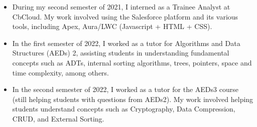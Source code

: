 \documentclass[10pt,a4paper,ragged2e]{altacv}
\begin{document}


\begin{fullwidth}
\makecvheader
\end{fullwidth}


\begin{itemize}
\item During my second semester of 2021, I interned as a Trainee Analyst at CbCloud. My work involved using the Salesforce platform and its various tools, including Apex, Aura/LWC (Javascript + HTML + CSS).
\end{itemize}
\begin{itemize}
\item In the first semester of 2022, I worked as a tutor for Algorithms and Data Structures (AEDs) 2, assisting students in understanding fundamental concepts such as ADTs, internal sorting algorithms, trees, pointers, space and time complexity, among others.
\item In the second semester of 2022, I worked as a tutor for the AEDs3 course (still helping students with questions from AEDs2). My work involved helping students understand concepts such as Cryptography, Data Compression, CRUD, and External Sorting.
\end{itemize}
\end{document}
